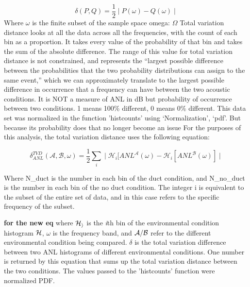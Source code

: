 \begin{equation} \label{eq:finitetotvar}
\delta(P,Q)=\frac{1}{2}\mid P(\omega)-Q(\omega) \mid 
\end{equation}
Where $\omega$ is the finite subset of the sample space omega: $\Omega$
Total variation distance looks at all the data across all the frequencies, with the count of each bin as a proportion. It takes every value of the probability of that bin and takes the sum of the absolute difference. The range of this value for total variation distance is not constrained, and represents the “largest possible difference between the probabilities that the two probability distributions can assign to the same event,” which we can approximately translate to the largest possible difference in occurrence that a frequency can have between the two acoustic conditions. It is NOT a measure of ANL in dB but probability of occurrence between two conditions. 1 means 100\% different, 0 means 0\% different.
This data set was normalized in the function 'histcounts' using ‘Normalization’, ‘pdf’. But because its probability does that no longer become an issue
For the purposes of this analysis, the total variation distance uses the following equation: 


\begin{equation}
    \delta ^{TVD} _{ANL} ( \mathcal{A}, \mathcal{B}, \omega) = \frac{1}{2} \sum _{i} ^{} \mid \mathcal{H}_{i} [ANL^{\mathcal{A}}(\omega)-\mathcal{H}_{i} [ANL^{\mathcal{B}}(\omega)] \mid 
\end{equation}

Where N\_duct is the number in each bin of the duct condition, and N\_no\_duct is the number in each bin of the no duct condition. The integer i is equivalent to the subset of the entire set of data, and in this case refers to the specific frequency of the subset. 

\textbf{ for the new eq} where  $\cal{H}_{i}$ is the \textit{i}th bin of the environmental condition histogram $\cal{H}$, $\omega$ is the frequency band, and $\cal{A/B}$ refer to the different environmental condition being compared. $\delta$ is the total variation difference between two ANL histograms of different environmental conditions. One number is returned by this equation that sums up the total variation distance between the two conditions. The values passed to the 'histcounts' function were normalized PDF.


